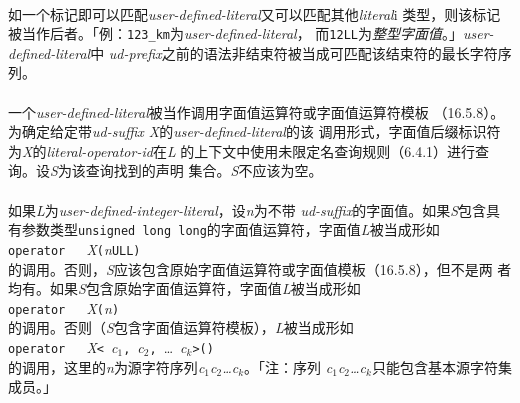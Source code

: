 \paragraph{}
如一个标记即可以匹配\textit{user-defined-literal}又可以匹配其他\textit{literal}i
类型，则该标记被当作后者。「例：\texttt{123\_km}为\textit{user-defined-literal}，
而\texttt{12LL}为\textit{整型字面值}。」\textit{user-defined-literal}中
\textit{ud-prefix}之前的语法非结束符被当成可匹配该结束符的最长字符序列。

\paragraph{}
一个\textit{user-defined-literal}被当作调用字面值运算符或字面值运算符模板
（16.5.8）。为确定给定带\textit{ud-suffix X}的\textit{user-defined-literal}的该
调用形式，字面值后缀标识符为\textit{X}的\textit{literal-operator-id}在\textit{L}
的上下文中使用未限定名查询规则（6.4.1）进行查询。设\textit{S}为该查询找到的声明
集合。\textit{S}不应该为空。

\paragraph{}
如果\textit{L}为\textit{user-defined-integer-literal}，设\textit{n}为不带
\textit{ud-suffix}的字面值。如果\textit{S}包含具有参数类型\texttt{unsigned long
long}的字面值运算符，字面值\textit{L}被当成形如                               \\
\mbox{\qquad \texttt{operator \qdbl\qdbl}\ \
  \textit{X}\texttt{(}\textit{n}\texttt{ULL)}}                                \\
的调用。否则，\textit{S}应该包含原始字面值运算符或字面值模板（16.5.8），但不是两
者均有。如果\textit{S}包含原始字面值运算符，字面值\textit{L}被当成形如        \\
\mbox{\qquad \texttt{operator \qdbl\qdbl}\ \
  \textit{X}\texttt{(\qdbl}\textit{n}\texttt{\qdbl)}}                         \\
的调用。否则（\textit{S}包含字面值运算符模板），\textit{L}被当成形如          \\
\mbox{\qquad \texttt{operator \qdbl\qdbl}\ \ \textit{X}\texttt{<}
  \textit{\qsgl c$_1$\qsgl}\texttt{,} \textit{\qsgl c$_2$\qsgl}\texttt{,} \ldots
  \textit{\qsgl c$_k$\qsgl}\texttt{>()}}                                      \\
的调用，这里的\textit{n}为源字符序列\textit{c$_1$c$_2$\ldots c$_k$}。「注：序列
\textit{c$_1$c$_2$\ldots c$_k$}只能包含基本源字符集成员。」

